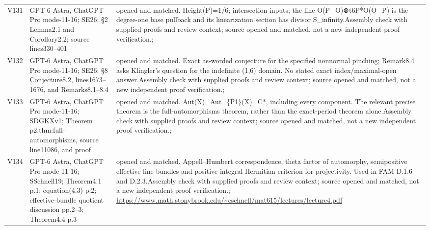 \documentclass[11pt,a4paper]{article}
\theoremstyle{plain}
\theoremstyle{definition}
\begin{document}
\begin{longtable}{@{}L{.08\linewidth}L{.31\linewidth}L{.56\linewidth}@{}}
V131 & GPT-6 Astra, ChatGPT Pro mode-11-16; S\newline E26; §2 Lemma2.1 and Corollary2.2; source lines330--401 & opened and matched. Height(P)=1/\allowbreak{}6; intersection inputs; the line O(P−O)⊗t6P*O(O−P) is the degree-one base pullback and its linearization section has divisor S\_\allowbreak{}infinity.\newline Assembly check with supplied proofs and review context; source opened and matched, not a new independent proof verification.\newline {}; \\
V132 & GPT-6 Astra, ChatGPT Pro mode-11-16; S\newline E26; §8 Conjecture8.2, lines1673--1676, and Remarks8.1--8.4 & opened and matched. Exact as-worded conjecture for the specified nonnormal pinching; Remark8.4 asks Klingler's question for the indefinite (1,6) domain. No stated exact index/\allowbreak{}maximal-open answer.\newline Assembly check with supplied proofs and review context; source opened and matched, not a new independent proof verification.\newline {}; \\
V133 & GPT-6 Astra, ChatGPT Pro mode-11-16; S\newline DGKXv1; Theorem p2:\allowbreak{}thm:\allowbreak{}full-automorphisms, source line11086, and proof & opened and matched. Aut(X)=Aut\_\allowbreak{}\{P1\}(X)=C*, including every component. The relevant precise theorem is the full-automorphisms theorem, rather than the exact-period theorem alone.\newline Assembly check with supplied proofs and review context; source opened and matched, not a new independent proof verification.\newline {}; \\
V134 & GPT-6 Astra, ChatGPT Pro mode-11-16; S\newline Schnell19; Theorem4.1 p.1; equation(4.3) p.2; effective-bundle quotient discussion pp.2--3; Theorem4.4 p.3 & opened and matched. Appell--Humbert correspondence, theta factor of automorphy, semipositive effective line bundles and positive integral Hermitian criterion for projectivity. Used in FAM D.1.6 and D.2.3.\newline Assembly check with supplied proofs and review context; source opened and matched, not a new independent proof verification.\newline {}; \url{https://www.math.stonybrook.edu/~cschnell/mat615/lectures/lecture4.pdf}\\

\end{longtable}
\end{document}
